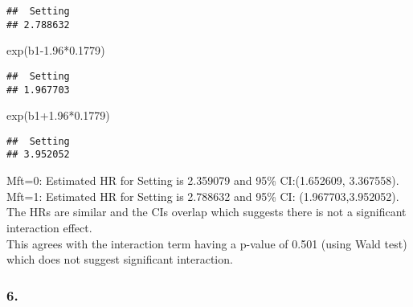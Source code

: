 \documentclass[
]{article}
\newenvironment{Shaded}{\begin{snugshade}}{\end{snugshade}}
\newcommand{\FloatTok}[1]{\textcolor[rgb]{0.00,0.00,0.81}{#1}}
\newcommand{\FunctionTok}[1]{\textcolor[rgb]{0.00,0.00,0.00}{#1}}
\newcommand{\NormalTok}[1]{#1}
\newcommand{\SpecialCharTok}[1]{\textcolor[rgb]{0.00,0.00,0.00}{#1}}
\begin{document}
\begin{verbatim}
##  Setting 
## 2.788632
\end{verbatim}

\begin{Shaded}
\begin{Highlighting}[]
\FunctionTok{exp}\NormalTok{(b1}\FloatTok{{-}1.96}\SpecialCharTok{*}\FloatTok{0.1779}\NormalTok{)}
\end{Highlighting}
\end{Shaded}

\begin{verbatim}
##  Setting 
## 1.967703
\end{verbatim}

\begin{Shaded}
\begin{Highlighting}[]
\FunctionTok{exp}\NormalTok{(b1}\FloatTok{+1.96}\SpecialCharTok{*}\FloatTok{0.1779}\NormalTok{)}
\end{Highlighting}
\end{Shaded}

\begin{verbatim}
##  Setting 
## 3.952052
\end{verbatim}

Mft=0: Estimated HR for Setting is 2.359079 and 95\% CI:(1.652609,
3.367558).\\
Mft=1: Estimated HR for Setting is 2.788632 and 95\% CI:
(1.967703,3.952052).\\
The HRs are similar and the CIs overlap which suggests there is not a
significant interaction effect.\\
This agrees with the interaction term having a p-value of 0.501 (using
Wald test) which does not suggest significant interaction.

\hypertarget{section}{%
\subsubsection{6.}\label{section}}
\end{document}
